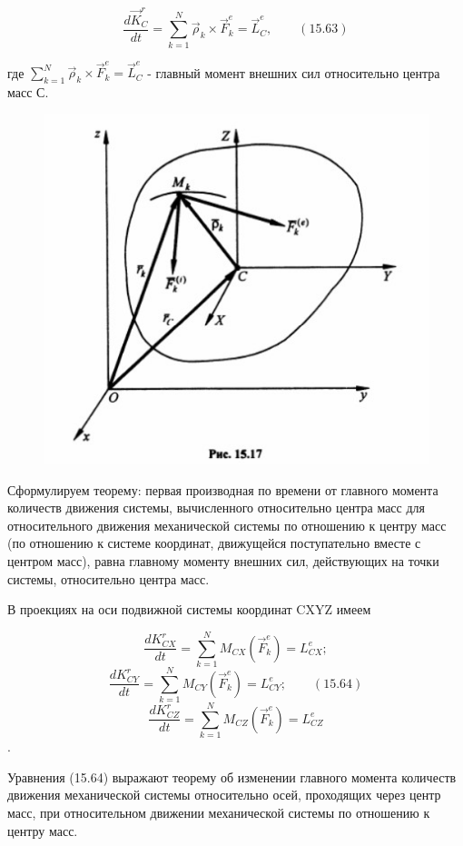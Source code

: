 {\begin{center}
	  $$\frac{d \vec K_C^r}{dt} = \sum\limits_{k=1}^N \vec\rho_k \times \vec F_k^e = \vec L_C^e, \qquad (15.63)$$

	  \par где $\sum\limits_{k=1}^N \vec\rho_k \times \vec F_k^e = \vec L_C^e$ - главный момент внешних сил относительно центра масс С.

     \par \begin{figure}[H]
     \centering\includegraphics[scale=0.7]{img/15.17.jpg} 
     \end{figure} 

	  \par Сформулируем теорему: первая производная по времени от главного момента количеств движения системы, вычисленного относительно центра масс для относительного движения механической системы по отношению к центру масс (по отношению к системе координат, движущейся поступательно вместе с центром масс), равна главному моменту внешних сил, действующих на точки системы, относительно центра масс.

	  \par В проекциях на оси подвижной системы координат CXYZ имеем

	  $$\frac{d K_{CX}^r}{dt} = \sum\limits_{k=1}^N M_{CX} (\vec F_k^e) = L_{CX}^e;$$
	  $$\frac{d K_{CY}^r}{dt} = \sum\limits_{k=1}^N M_{CY} (\vec F_k^e) = L_{CY}^e; \qquad (15.64)$$
	  $$\frac{d K_{CZ}^r}{dt} = \sum\limits_{k=1}^N M_{CZ} (\vec F_k^e) = L_{CZ}^e$$.

   \par Уравнения  (15.64)  выражают  теорему  об  изменении  главного  момента количеств движения механической системы относительно осей, проходящих через центр масс, при относительном движении механической системы по отношению к центру масс.


\end{center}}
